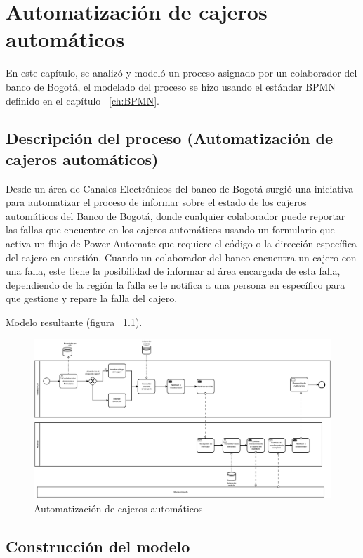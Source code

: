 \chapter{Automatización de cajeros automáticos}
En este capítulo, se analizó y modeló un proceso asignado por un colaborador del banco de Bogotá, el modelado del proceso se hizo usando el estándar BPMN definido en el capítulo ~\ref{ch:BPMN}.

\section{Descripción del proceso (Automatización de cajeros automáticos)}
Desde un área de Canales Electrónicos del banco de Bogotá surgió una iniciativa para automatizar el proceso de informar sobre el estado de los cajeros automáticos del Banco de Bogotá, donde cualquier colaborador puede reportar las fallas que encuentre en los cajeros automáticos usando un formulario que activa un flujo de Power Automate que requiere el código o la dirección específica del cajero en cuestión. Cuando un colaborador del banco encuentra un cajero con una falla, este tiene la posibilidad de informar al área encargada de esta falla, dependiendo de la región la falla se le notifica a una persona en específico para que gestione y repare la falla del cajero.

Modelo resultante (figura ~\ref{fig:AcA}).

\begin{figure}[H]
	\centering
	\includegraphics[scale=0.25]{Capitulo3/imagenes/diagram-Cajeros.png}
	\caption{Automatización de cajeros automáticos}
	\label{fig:AcA}
\end{figure}

\section{Construcción del modelo}

